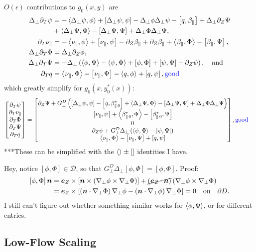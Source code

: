 \documentclass{article}
\newcommand{\para}{\parallel}
\newcommand{\ep}{\epsilon}
\newcommand{\np}{\nabla_\perp}
\newcommand{\lap}{\Delta_\perp}
\newcommand{\p}{\partial}
\newcommand{\GD}{G_\perp^D}
\newcommand{\pth} [1] {\left( #1 \right) }
\newcommand{\br} [1] {\left[ #1 \right] }
\newcommand{\bmat} [1] {\begin{bmatrix} #1 \end{bmatrix}}
\begin{document}
$O(\ep)$ contributions to $g_0(x,y)$ are 
\begin{align*}
    \lap\p_T\psi &= - \Braket{\lap\psi, \phi} + \br{\lap\psi, \psi} - \lap\phi\lap\psi - \br{q,\beta_\para} + \lap\p_Z\Psi \\ 
        &+ \Braket{\lap\Psi, \Phi} - \br{\lap\Psi, \Psi} + \lap\Phi\lap\Psi, \\ 
    \p_T\nu_\para &= - \Braket{\nu_\para, \phi} + \br{\nu_\para, \psi} - \p_Z\beta_\para + \p_Z\beta_\para + \Braket{\beta_\para,\Phi} -\br{\beta_\para, \Psi}, \\ 
    \lap \p_T\Phi &= \lap \p_Z\phi, \\ 
    \lap \p_T\Psi &= - \lap\pth{\Braket{\phi, \Psi} - \Braket{\psi, \Phi} + \br{\phi, \Phi} + \br{\psi, \Psi} - \p_Z\psi}, \quad\text{and} \\ 
    \p_Tq &= \Braket{\nu_\para, \Phi} - \br{\nu_\para, \Psi} - \Braket{q, \phi} + \br{q, \psi}, \text{\color{blue}good}
\end{align*}
which greatly simplify for $g_0(x,y_0^*(x))$: 
\begin{align*}
    \bmat{\p_T\psi \\ \p_T\nu_\para \\ \p_T\Phi \\ \p_T\Psi \\ \p_Tq} 
    &= \bmat{\p_Z\Psi + \GD\pth{ \br{\lap\psi, \psi} - \br{q,\beta_{\para\,0}^*} + \Braket{\lap\Psi, \Phi} - \br{\lap\Psi, \Psi} + \lap\Phi\lap\Psi} \\ 
    \br{\nu_\para, \psi} + \Braket{\beta_{\para\,0}^*,\Phi} - \br{\beta_{\para\,0}^*, \Psi} \\ 
    0 \\ 
    \p_Z\psi + \GD\lap\pth{\Braket{\psi, \Phi} - \br{\psi, \Psi}} \\ 
    \Braket{\nu_\para, \Phi} - \br{\nu_\para, \Psi} + \br{q, \psi}}, \text{\color{blue}good}
\end{align*}
***These can be simplified with the $\Braket{} \pm \br{}$ identities I have. 

Hey, notice $\br{\phi,\Phi}\in\mathcal{D}$, so that $\GD\lap\br{\phi,\Phi} = \br{\phi,\Phi}$. Proof: 
\begin{align*}
    \br{\phi,\Phi}\bm{n} &= \bm{e}_Z\times \br{\bm{n}\times \pth{\np\phi\times\np\Phi}} + \cancel{\pth{\bm{e}_Z\cdot\bm{n}}} \pth{\np\phi\times\np\Phi} \\ 
    &= \bm{e}_Z\times \br{\pth{\bm{n}\cdot\np\Phi}\np\phi - \pth{\bm{n}\cdot\np\phi}\np\Phi} = 0 \quad\text{on}\quad \p D. 
\end{align*}
I still can't figure out whether something similar works for $\Braket{\phi,\Phi}$, or for different entries. 

\subsection{Low-Flow Scaling}
\end{document}
